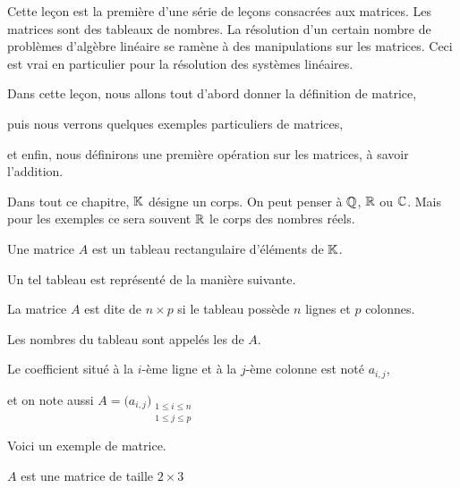 







\debuttexte


\diapo

\change
Cette leçon est la première d'une série de leçons consacrées aux matrices. Les matrices sont des tableaux de nombres. La résolution d'un
certain nombre de problèmes d'algèbre linéaire se ramène
à des manipulations sur les matrices. Ceci est vrai en particulier 
pour la résolution des systèmes linéaires.  

\change
Dans cette leçon, nous allons tout d'abord donner la définition de matrice,

\change
puis nous verrons quelques exemples particuliers de matrices,

\change
et enfin, nous définirons une première opération sur les matrices, à savoir l'addition.

\diapo

Dans tout ce chapitre, $\mathbb{K}$ désigne un corps. On peut penser à $\mathbb{Q}$, $\mathbb{R}$ ou $\mathbb{C}$.
Mais pour les exemples ce sera souvent $\mathbb{R}$ le corps des nombres réels.

\change
Une matrice $A$ est un tableau rectangulaire  d'éléments de $\mathbb{K}$.

\change
Un tel tableau est représenté de la manière suivante.

\change
La matrice $A$ est dite de  $n \times p$ si le tableau 
possède $n$ lignes et $p$ colonnes. 

\change
Les nombres du tableau sont appelés les  de $A$. 

\change
Le coefficient situé à  la $i$-ème ligne et à la $j$-ème colonne est noté $a_{i,j}$,

\change
et on note aussi $A= \big(a_{i,j}\big)_{\substack{1\leq i \leq n \\ 1\leq j \leq p}}$

\diapo

Voici un exemple de matrice.

\change

$A$ est une matrice de taille $2\times 3$ 

